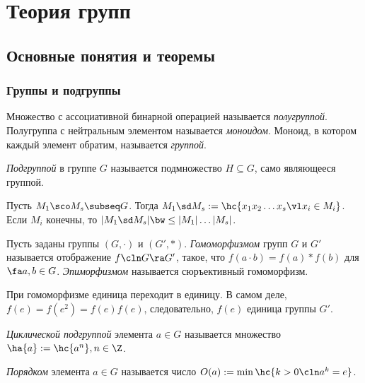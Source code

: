\documentclass[a4paper]{article}
\begin{document}
\medskip
\dmvntrail

\pagebreak

\section{Теория групп}

\subsection{Основные понятия и теоремы}

\subsubsection{Группы и подгруппы}

\begin{df}
Множество с ассоциативной бинарной операцией называется \emph{полугруппой}. Полугруппа с нейтральным
элементом называется \emph{моноидом}. Моноид, в котором каждый элемент обратим, называется
\emph{группой}.
\end{df}

\begin{df}
\emph{Подгруппой} в группе $G$ называется подмножество $H \subseteq G$, само являющееся группой.
\end{df}

Пусть $M_1 \sco M_s \subseq G$. Тогда $M_1 \sd M_s := \hc{x_1 x_2 \ldots x_s \vl x_i \in M_i}$.
Если $M_i$ конечны, то $|M_1 \sd M_s| \bw\le |M_1|\ldots|M_s|$.

\begin{df}
Пусть заданы группы $(G, \cdot)$ и $(G', *)$. \emph{Гомоморфизмом} групп $G$ и $G'$ называется отображение
$f\cln G \ra G'$, такое, что $f(a \cdot b)=f(a)*f(b)$ для $\fa a,b \in G$. \emph{Эпиморфизмом} называется
сюръективный гомоморфизм.
\end{df}

При гомоморфизме единица переходит в единицу. В самом деле, $f(e) = f(e^2) = f(e)f(e)$, следовательно,
$f(e)$ единица группы $G'$.

\begin{df}
\emph{Циклической подгруппой} элемента $a \in G$ называется множество $\ha{a} := \hc{a^n}, n \in \Z$.
\end{df}

\begin{df}
\emph{Порядком} элемента $a \in G$ называется число $O(a) := \min\hc{k>0\cln a^k = e}$.
\end{df}
\end{document}
